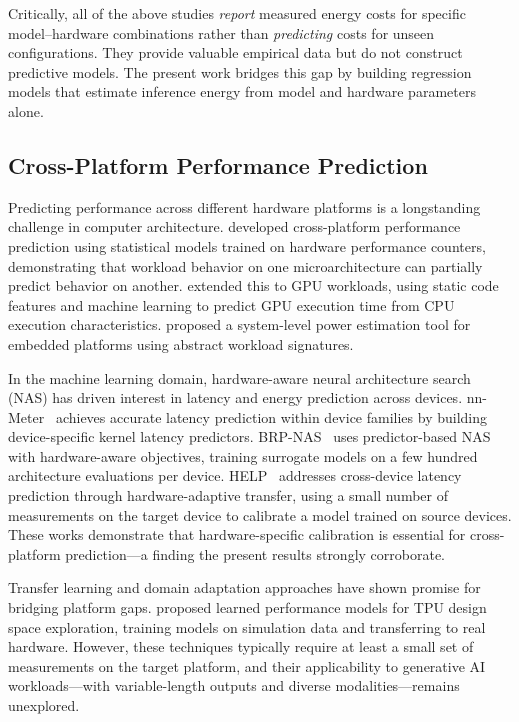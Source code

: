 \documentclass[review,12pt,authoryear]{elsarticle}
\begin{document}
Critically, all of the above studies \emph{report} measured energy costs for specific model--hardware combinations rather than \emph{predicting} costs for unseen configurations.
They provide valuable empirical data but do not construct predictive models.
The present work bridges this gap by building regression models that estimate inference energy from model and hardware parameters alone.

\subsection{Cross-Platform Performance Prediction}
\label{sec:rw_cross_platform}

Predicting performance across different hardware platforms is a longstanding challenge in computer architecture.
\citet{lee2006accurate} developed cross-platform performance prediction using statistical models trained on hardware performance counters, demonstrating that workload behavior on one microarchitecture can partially predict behavior on another.
\citet{ardalani2015cross} extended this to GPU workloads, using static code features and machine learning to predict GPU execution time from CPU execution characteristics.
\citet{rethinagiri2014system} proposed a system-level power estimation tool for embedded platforms using abstract workload signatures.

In the machine learning domain, hardware-aware neural architecture search (NAS) has driven interest in latency and energy prediction across devices.
nn-Meter~\citep{zhang2021nnmeter} achieves accurate latency prediction within device families by building device-specific kernel latency predictors.
BRP-NAS~\citep{dudziak2020brpnas} uses predictor-based NAS with hardware-aware objectives, training surrogate models on a few hundred architecture evaluations per device.
HELP~\citep{lee2021help} addresses cross-device latency prediction through hardware-adaptive transfer, using a small number of measurements on the target device to calibrate a model trained on source devices.
These works demonstrate that hardware-specific calibration is essential for cross-platform prediction---a finding the present results strongly corroborate.

Transfer learning and domain adaptation approaches have shown promise for bridging platform gaps.
\citet{kaufman2021learned} proposed learned performance models for TPU design space exploration, training models on simulation data and transferring to real hardware.
However, these techniques typically require at least a small set of measurements on the target platform, and their applicability to generative AI workloads---with variable-length outputs and diverse modalities---remains unexplored.
\end{document}
